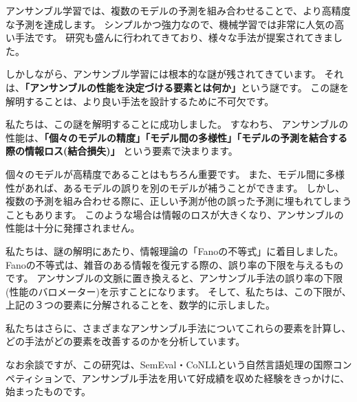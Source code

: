 アンサンブル学習では、複数のモデルの予測を組み合わせることで、より高精度な予測を達成します。
シンプルかつ強力なので、機械学習では非常に人気の高い手法です。
研究も盛んに行われてきており、様々な手法が提案されてきました。

しかしながら、アンサンブル学習には根本的な謎が残されてきています。
それは、\textbf{「アンサンブルの性能を決定づける要素とは何か」}という謎です。
この謎を解明することは、より良い手法を設計するために不可欠です。

私たちは、この謎を解明することに成功しました。
すなわち、 アンサンブルの性能は、\textbf{「個々のモデルの精度」「モデル間の多様性」「モデルの予測を結合する際の情報ロス(結合損失)」} という要素で決まります。

個々のモデルが高精度であることはもちろん重要です。
また、モデル間に多様性があれば、あるモデルの誤りを別のモデルが補うことができます。
しかし、複数の予測を組み合わせる際に、正しい予測が他の誤った予測に埋もれてしまうこともあります。
このような場合は情報のロスが大きくなり、アンサンブルの性能は十分に発揮されません。

私たちは、謎の解明にあたり、情報理論の「Fanoの不等式」に着目しました。
Fanoの不等式は、雑音のある情報を復元する際の、誤り率の下限を与えるものです。
アンサンブルの文脈に置き換えると、アンサンブル手法の誤り率の下限(性能のバロメーター)を示すことになります。
そして、私たちは、この下限が、上記の３つの要素に分解されることを、数学的に示しました。

私たちはさらに、さまざまなアンサンブル手法についてこれらの要素を計算し、どの手法がどの要素を改善するのかを分析しています。

なお余談ですが、この研究は、SemEval・CoNLLという自然言語処理の国際コンペティションで、アンサンブル手法を用いて好成績を収めた経験をきっかけに、始まったものです。
